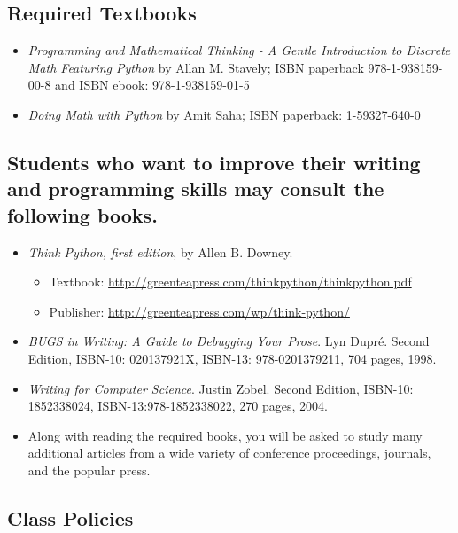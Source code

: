 \documentclass[11pt]{article} %
\begin{document}
\subsection*{Required Textbooks}


\begin{itemize}
  \item {\em Programming and Mathematical Thinking - A Gentle Introduction to Discrete Math Featuring Python} by Allan M. Stavely; ISBN paperback 978-1-938159-00-8 and ISBN ebook: 978-1-938159-01-5
  \item {\em Doing Math with Python} by Amit Saha; ISBN paperback: 1-59327-640-0

\end{itemize}

\subsection*{Students who want to improve their writing and programming skills may consult the following books.}

\begin{itemize}

\item \emph{Think Python, first edition}, by Allen B. Downey.
	\begin{itemize}
		\item Textbook: \url{http://greenteapress.com/thinkpython/thinkpython.pdf}
		\item Publisher: \url{http://greenteapress.com/wp/think-python/}
	\end{itemize}

\item {\em BUGS in Writing: A Guide to Debugging Your Prose}. Lyn Dupr\'e. Second Edition,  ISBN-10: 020137921X,
ISBN-13: 978-0201379211, 704 pages, 1998.

\item {\em Writing for Computer Science}.  Justin Zobel. Second Edition,  ISBN-10: 1852338024, ISBN-13:978-1852338022, 270 pages, 2004.

\item Along with reading the required books, you will be asked to study many additional articles from a wide variety of conference proceedings, journals, and the popular press.
\end{itemize}

\subsection*{Class Policies}
\end{document}
